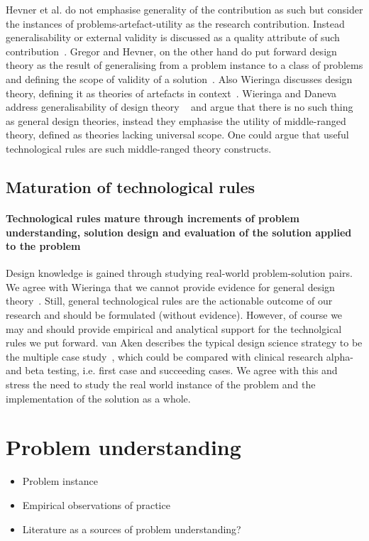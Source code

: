\documentclass[graybox]{svmult}
\begin{document}
Hevner et al. do not emphasise generality of the contribution as such but consider the instances of problems-artefact-utility as the research contribution. Instead generalisability or external validity is discussed as a quality attribute of such contribution~\cite{hevner_design_2004}. Gregor and Hevner, on the other hand do put forward design theory as the result of generalising from a problem instance to a class of problems and defining the scope of validity of a solution~\cite{gregor_positioning_2013}. Also Wieringa discusses design theory, defining it as theories of artefacts in context~\cite{wieringa_design_2009}. Wieringa and Daneva address generalisability of design theory ~\cite{wieringa_six_2015} and argue that there is no such thing as general design theories, instead they emphasise the utility of middle-ranged theory, defined as theories lacking universal scope. One could argue that useful technological rules are such middle-ranged theory constructs.

\subsection{Maturation of technological rules}
\paragraph{Technological rules mature through increments of problem understanding, solution design and evaluation of the solution applied to the problem} 

Design knowledge is gained through studying real-world problem-solution pairs. We agree with Wieringa that we cannot provide evidence for general design theory~\cite{wieringa_six_2015}. Still, general technological rules are the actionable outcome of our research and should be formulated (without evidence). However, of course we may and should provide empirical and analytical support for the technolgical rules we put forward. van Aken describes the typical design science strategy to be the multiple case study~\cite{van_aken_management_2004}, which could be compared with clinical research alpha- and beta testing, i.e. first case and succeeding cases. We agree with this and stress the need to study the real world instance of the problem and the implementation of the solution as a whole.

\section{Problem understanding}
\begin{itemize}
\item Problem instance
\item Empirical observations of practice
\item Literature as a sources of problem understanding?
\end{itemize}
\end{document}

